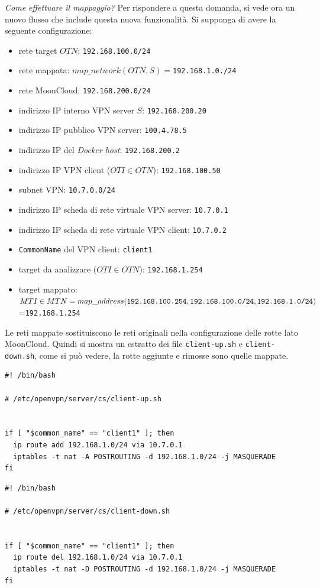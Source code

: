 \textit{Come effettuare il mappaggio?} Per rispondere a questa domanda, si vede ora
un nuovo flusso che include questa nuova funzionalità.
Si supponga di avere la seguente configurazione:
\begin{itemize}
  \item rete target $OTN$: \texttt{192.168.100.0/24}
  \item rete mappata: $map\_network(OTN, S)=$\texttt{192.168.1.0./24}
  \item rete MoonCloud: \texttt{192.168.200.0/24}
  \item indirizzo IP interno VPN server $S$: \texttt{192.168.200.20}
  \item indirizzo IP pubblico VPN server: \texttt{100.4.78.5}
  \item indirizzo IP del \textit{Docker host}: \texttt{192.168.200.2}
  \item indirizzo IP VPN client ($OTI \in OTN$): \texttt{192.168.100.50}
  \item subnet VPN: \texttt{10.7.0.0/24}
  \item indirizzo IP scheda di rete virtuale VPN server: \texttt{10.7.0.1}
  \item indirizzo IP scheda di rete virtuale VPN client: \texttt{10.7.0.2}
  \item \texttt{CommonName} del VPN client: \texttt{client1}
  \item target da analizzare ($OTI \in OTN$): \texttt{192.168.1.254}
  \item target mappato: $MTI \in MTN=map\_address(\texttt{192.168.100.254},
  \texttt{192.168.100.0/24},\\
  \texttt{192.168.1.0/24})$=\texttt{192.168.1.254}
\end{itemize}
Le reti mappate sostituiscono le reti originali nella configurazione delle rotte lato
MoonCloud. Quindi si mostra un estratto dei file \texttt{client-up.sh} e
\texttt{client-down.sh}, come si può vedere, la rotte aggiunte e rimosse sono
quelle mappate.
\begin{verbatim}
#! /bin/bash

# /etc/openvpn/server/cs/client-up.sh


if [ "$common_name" == "client1" ]; then
  ip route add 192.168.1.0/24 via 10.7.0.1
  iptables -t nat -A POSTROUTING -d 192.168.1.0/24 -j MASQUERADE
fi
\end{verbatim}
\begin{verbatim}
#! /bin/bash

# /etc/openvpn/server/cs/client-down.sh


if [ "$common_name" == "client1" ]; then
  ip route del 192.168.1.0/24 via 10.7.0.1
  iptables -t nat -D POSTROUTING -d 192.168.1.0/24 -j MASQUERADE
fi
\end{verbatim}
